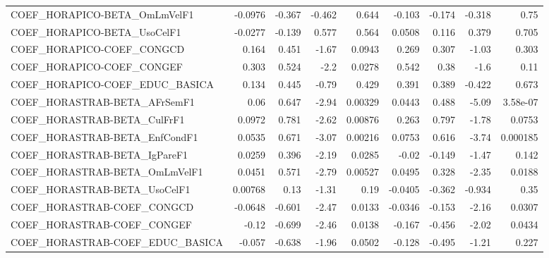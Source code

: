 \begin{tabular}{lrrrrrrrr}
COEF\_HORAPICO-BETA\_OmLmVelF1          &     -0.0976 &       -0.367 &  -0.462 &    0.644 &     -0.103 &      -0.174 &       -0.318 &          0.75 \\
COEF\_HORAPICO-BETA\_UsoCelF1           &     -0.0277 &       -0.139 &   0.577 &    0.564 &     0.0508 &       0.116 &        0.379 &         0.705 \\
COEF\_HORAPICO-COEF\_CONGCD             &       0.164 &        0.451 &   -1.67 &   0.0943 &      0.269 &       0.307 &        -1.03 &         0.303 \\
COEF\_HORAPICO-COEF\_CONGEF             &       0.303 &        0.524 &    -2.2 &   0.0278 &      0.542 &        0.38 &         -1.6 &          0.11 \\
COEF\_HORAPICO-COEF\_EDUC\_BASICA        &       0.134 &        0.445 &   -0.79 &    0.429 &      0.391 &       0.389 &       -0.422 &         0.673 \\
COEF\_HORASTRAB-BETA\_AFrSemF1          &        0.06 &        0.647 &   -2.94 &  0.00329 &     0.0443 &       0.488 &        -5.09 &      3.58e-07 \\
COEF\_HORASTRAB-BETA\_CulFrF1           &      0.0972 &        0.781 &   -2.62 &  0.00876 &      0.263 &       0.797 &        -1.78 &        0.0753 \\
COEF\_HORASTRAB-BETA\_EnfCondF1         &      0.0535 &        0.671 &   -3.07 &  0.00216 &     0.0753 &       0.616 &        -3.74 &      0.000185 \\
COEF\_HORASTRAB-BETA\_IgPareF1          &      0.0259 &        0.396 &   -2.19 &   0.0285 &      -0.02 &      -0.149 &        -1.47 &         0.142 \\
COEF\_HORASTRAB-BETA\_OmLmVelF1         &      0.0451 &        0.571 &   -2.79 &  0.00527 &     0.0495 &       0.328 &        -2.35 &        0.0188 \\
COEF\_HORASTRAB-BETA\_UsoCelF1          &     0.00768 &         0.13 &   -1.31 &     0.19 &    -0.0405 &      -0.362 &       -0.934 &          0.35 \\
COEF\_HORASTRAB-COEF\_CONGCD            &     -0.0648 &       -0.601 &   -2.47 &   0.0133 &    -0.0346 &      -0.153 &        -2.16 &        0.0307 \\
COEF\_HORASTRAB-COEF\_CONGEF            &       -0.12 &       -0.699 &   -2.46 &   0.0138 &     -0.167 &      -0.456 &        -2.02 &        0.0434 \\
COEF\_HORASTRAB-COEF\_EDUC\_BASICA       &      -0.057 &       -0.638 &   -1.96 &   0.0502 &     -0.128 &      -0.495 &        -1.21 &         0.227 \\

\end{tabular}

